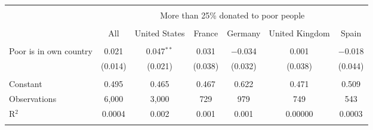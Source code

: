 
\begin{tabular}{@{\extracolsep{5pt}}lcccccc} 
\\[-1.8ex]\hline 
\hline \\[-1.8ex] 
 & \multicolumn{6}{c}{More than 25\% donated to poor people} \\ 
\cline{2-7} 
\\[-1.8ex] & All & United States & France & Germany & United Kingdom & Spain \\ 
\hline \\[-1.8ex] 
 Poor is in own country & 0.021 & 0.047$^{**}$ & 0.031 & $-$0.034 & 0.001 & $-$0.018 \\ 
  & (0.014) & (0.021) & (0.038) & (0.032) & (0.038) & (0.044) \\ 
 \hline \\[-1.8ex] 
Constant & 0.495 & 0.465 & 0.467 & 0.622 & 0.471 & 0.509 \\ 
Observations & 6,000 & 3,000 & 729 & 979 & 749 & 543 \\ 
R$^{2}$ & 0.0004 & 0.002 & 0.001 & 0.001 & 0.00000 & 0.0003 \\ 
\hline 
\hline \\[-1.8ex] 
\end{tabular} 